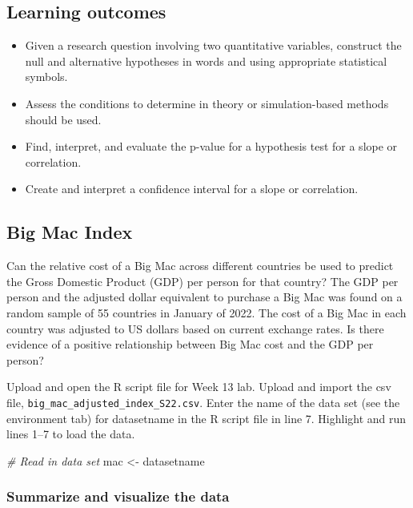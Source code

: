 \documentclass[
]{report}
\newenvironment{Shaded}{\begin{snugshade}}{\end{snugshade}}
\newcommand{\CommentTok}[1]{\textcolor[rgb]{0.56,0.35,0.01}{\textit{#1}}}
\newcommand{\NormalTok}[1]{#1}
\newcommand{\OtherTok}[1]{\textcolor[rgb]{0.56,0.35,0.01}{#1}}
\begin{document}

\hypertarget{learning-outcomes-27}{%
\subsection{Learning outcomes}\label{learning-outcomes-27}}

\begin{itemize}
\item
  Given a research question involving two quantitative variables, construct the null and alternative hypotheses
  in words and using appropriate statistical symbols.
\item
  Assess the conditions to determine in theory or simulation-based methods should be used.
\item
  Find, interpret, and evaluate the p-value for a hypothesis test for a slope or correlation.
\item
  Create and interpret a confidence interval for a slope or correlation.
\end{itemize}

\hypertarget{big-mac-index}{%
\subsection{Big Mac Index}\label{big-mac-index}}

Can the relative cost of a Big Mac across different countries be used to predict the Gross Domestic Product (GDP) per person for that country? The GDP per person and the adjusted dollar equivalent to purchase a Big Mac was found on a random sample of 55 countries in January of 2022. The cost of a Big Mac in each country was adjusted to US dollars based on current exchange rates. Is there evidence of a positive relationship between Big Mac cost and the GDP per person?

Upload and open the R script file for Week 13 lab. Upload and import the csv file, \texttt{big\_mac\_adjusted\_index\_S22.csv}. Enter the name of the data set (see the environment tab) for datasetname in the R script file in line 7. Highlight and run lines 1--7 to load the data.

\begin{Shaded}
\begin{Highlighting}[]
\CommentTok{\# Read in data set }
\NormalTok{mac }\OtherTok{\textless{}{-}}\NormalTok{ datasetname}
\end{Highlighting}
\end{Shaded}

\hypertarget{summarize-and-visualize-the-data-7}{%
\subsubsection*{Summarize and visualize the data}\label{summarize-and-visualize-the-data-7}}
\end{document}
